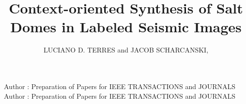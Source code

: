 \documentclass{ieeeaccess}
\begin{document}

\title{Context-oriented Synthesis of Salt Domes in Labeled Seismic Images}
\author{\uppercase{Luciano D. Terres} and
\uppercase{Jacob Scharcanski},  }

\address[1]{Institute of Informatics,
Federal University of Rio Grande do Sul, Porto Alegre, RS, Brasil, 91501-970 (e-mail: ldterres@inf.ufrgs.br; jacobs@inf.ufrgs.br)}

\markboth
{Author \headeretal: Preparation of Papers for IEEE TRANSACTIONS and JOURNALS}
{Author \headeretal: Preparation of Papers for IEEE TRANSACTIONS and JOURNALS}

\end{document}
